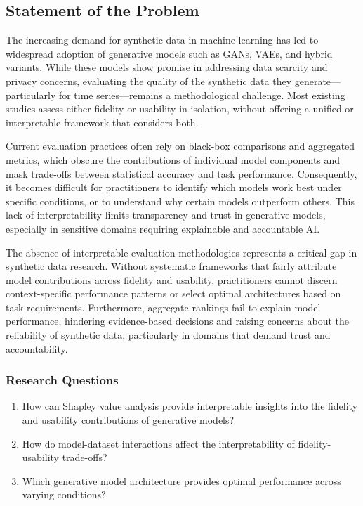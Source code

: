 \documentclass[11pt]{article}
\begin{document}
\subsection{Statement of the Problem}

The increasing demand for synthetic data in machine learning has led to widespread adoption of generative models such as GANs, VAEs, and hybrid variants. While these models show promise in addressing data scarcity and privacy concerns, evaluating the quality of the synthetic data they generate—particularly for time series—remains a methodological challenge. Most existing studies assess either fidelity or usability in isolation, without offering a unified or interpretable framework that considers both.

Current evaluation practices often rely on black-box comparisons and aggregated metrics, which obscure the contributions of individual model components and mask trade-offs between statistical accuracy and task performance. Consequently, it becomes difficult for practitioners to identify which models work best under specific conditions, or to understand why certain models outperform others. This lack of interpretability limits transparency and trust in generative models, especially in sensitive domains requiring explainable and accountable AI.

The absence of interpretable evaluation methodologies represents a critical gap in synthetic data research. Without systematic frameworks that fairly attribute model contributions across fidelity and usability, practitioners cannot discern context-specific performance patterns or select optimal architectures based on task requirements. Furthermore, aggregate rankings fail to explain model performance, hindering evidence-based decisions and raising concerns about the reliability of synthetic data, particularly in domains that demand trust and accountability.

\subsubsection{Research Questions}
\begin{enumerate}
    \item How can Shapley value analysis provide interpretable insights into the fidelity and usability contributions of generative models?
    \item How do model-dataset interactions affect the interpretability of fidelity-usability trade-offs?
    \item Which generative model architecture provides optimal performance across varying conditions?
\end{enumerate}
\end{document}
